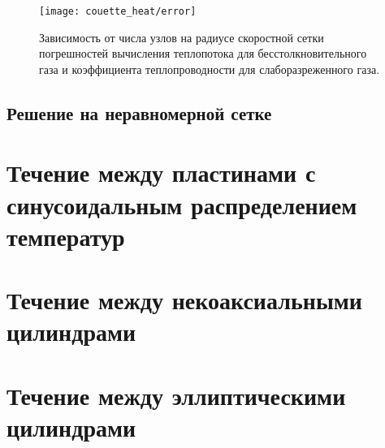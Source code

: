 \begin{figure}
    \centering
    \texttt{[image: couette\_heat/error]}
    \caption{
        Зависимость от числа узлов на радиусе скоростной сетки погрешностей вычисления
        теплопотока для бесстолкновительного газа и коэффициента теплопроводности для слаборазреженного газа.
    }\label{fig:error}
\end{figure}


\subsection{Решение на неравномерной сетке}


\section{Течение между пластинами с синусоидальным распределением температур} \label{sect:sone_bobylev}

\section{Течение между некоаксиальными цилиндрами} \label{sect:noncoaxial}

\section{Течение между эллиптическими цилиндрами} \label{sect:elliptic}

\clearpage
